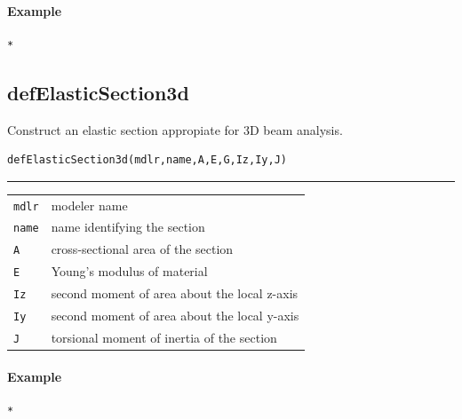 \paragraph{Example}
\begin{verbatim}
*
\end{verbatim}

\subsection{defElasticSection3d}
\noindent Construct an elastic section appropiate for 3D beam analysis.
\begin{verbatim}
defElasticSection3d(mdlr,name,A,E,G,Iz,Iy,J)
\end{verbatim}
\vspace{-10pt}
{\color{grayLines} \rule{\linewidth}{0.25pt}}
\begin{center}
\begin{tabular}{lp{10cm}}
{\tt mdlr} & modeler name \\
{\tt name} & name identifying the section \\
{\tt A} &  cross-sectional area of the section \\
{\tt E} &  Young's modulus of material \\
{\tt Iz} &  second moment of area about the local z-axis\\
{\tt Iy} &  second moment of area about the local y-axis\\
{\tt J} & torsional moment of inertia of the section \\
\end{tabular}
\end{center}
\paragraph{Example}
\begin{verbatim}
*
\end{verbatim}


